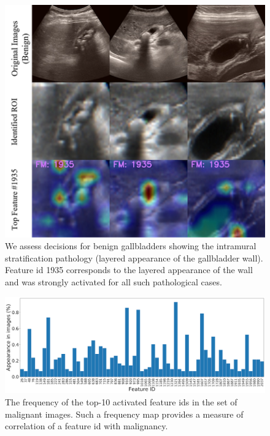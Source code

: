 \begin{figure}[t]
    \centering
    \includegraphics[width=0.6\linewidth]{figs/radformer/ben-1935.png}
    \caption[Visualization of a benign feature]{We assess \radformer decisions for benign gallbladders showing the intramural stratification pathology (layered appearance of the gallbladder wall). Feature id 1935 corresponds to the layered appearance of the wall and was strongly activated for all such pathological cases.}
    \label{fig:ben_corr_1}
\end{figure}
%
\begin{figure}[t]
    \centering
    \includegraphics[width=\linewidth]{figs/radformer/feature-freq.png}
    \caption[Frequency of top-10 activated features]{The frequency of the top-10 activated feature ids in the set of malignant images. Such a frequency map provides a measure of correlation of a feature id with malignancy.}
    \label{fig:correlation_freq}
\end{figure}
%

